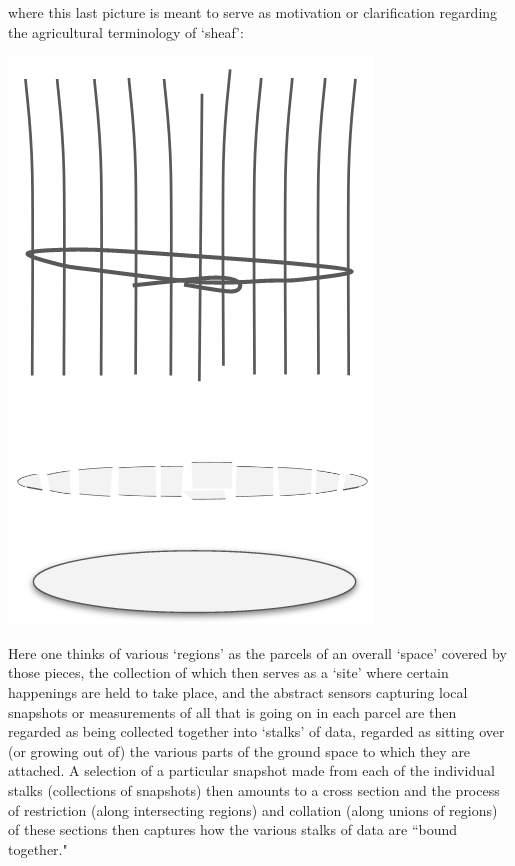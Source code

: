\documentclass[a4paper]{book}
\theoremstyle{definition}
\theoremstyle{definition}
\theoremstyle{definition}
\theoremstyle{theorem}
\theoremstyle{definition}
\begin{document}
	where this last picture is meant to serve as motivation or clarification regarding the agricultural terminology of `sheaf':  
	\begin{center}
		\includegraphics[scale=0.2]{AgriculturalSheaf2.png}
	\end{center}
	Here one thinks of various `regions' as the parcels of an overall `space' covered by those pieces, the collection of which then serves as a `site' where certain happenings are held to take place, and the abstract sensors capturing local snapshots or measurements of all that is going on in each parcel are then regarded as being collected together into `stalks' of data, regarded as sitting over (or growing out of) the various parts of the ground space to which they are attached. A selection of a particular snapshot made from each of the individual stalks (collections of snapshots) then amounts to a cross section and the process of restriction (along intersecting regions) and collation (along unions of regions) of these sections then captures how the various stalks of data are ``bound together." \par  
\end{document}
